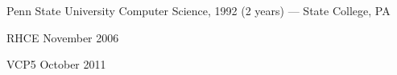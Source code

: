 


\begin{cvskills}


\cvskill
{Penn State University}
{Computer Science, 1992 (2 years) --- State College, PA}

\cvskill
{RHCE}
{November 2006}

\cvskill
{VCP5}
{October 2011}


\end{cvskills}

